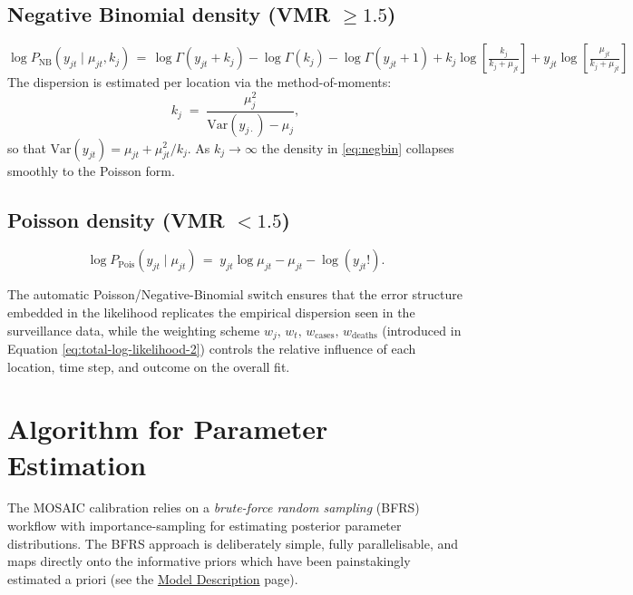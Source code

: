 \documentclass[
]{book}
\begin{document}
\subsection{\texorpdfstring{Negative Binomial density (VMR \(\ge 1.5\))}{Negative Binomial density (VMR \textbackslash ge 1.5)}}\label{negative-binomial-density-vmr-ge-1.5}

\begin{equation}
\log P_{\text{NB}}\!\left(y_{jt}\mid\mu_{jt},k_j\right)
\,=\,
\log\Gamma(y_{jt}+k_j)-\log\Gamma(k_j)-\log\Gamma(y_{jt}+1)
+k_j\log\!\left[\tfrac{k_j}{k_j+\mu_{jt}}\right]
+y_{jt}\log\!\left[\tfrac{\mu_{jt}}{k_j+\mu_{jt}}\right]
\label{eq:negbin}
\end{equation}
The dispersion is estimated per location via the method-of-moments:
\begin{equation}
k_j \;=\;\frac{\mu_j^2}{\mathrm{Var}(y_{j\cdot})-\mu_j},
\label{eq:dispersion}
\end{equation}
so that \(\mathrm{Var}(y_{jt})=\mu_{jt}+\mu_{jt}^2/k_j\). As \(k_j\rightarrow\infty\) the density in
\eqref{eq:negbin} collapses smoothly to the Poisson form.

\subsection{\texorpdfstring{Poisson density (VMR \(< 1.5\))}{Poisson density (VMR \textless{} 1.5)}}\label{poisson-density-vmr-1.5}

\begin{equation}
\log P_{\text{Pois}}\!\left(y_{jt}\mid\mu_{jt}\right)
\,=\;
y_{jt}\log\mu_{jt}-\mu_{jt}-\log(y_{jt}!).
\label{eq:poisson}
\end{equation}

The automatic Poisson/Negative-Binomial switch ensures that the
error structure embedded in the likelihood replicates the empirical
dispersion seen in the surveillance data, while the weighting scheme
\(w_j,\,w_t,\,w_{\text{cases}},\,w_{\text{deaths}}\) (introduced in
Equation \eqref{eq:total-log-likelihood-2}) controls the relative influence
of each location, time step, and outcome on the overall fit.

\section{Algorithm for Parameter Estimation}\label{algorithm-for-parameter-estimation}

The MOSAIC calibration relies on a \emph{brute-force random sampling} (BFRS) workflow with importance-sampling for estimating posterior parameter distributions. The BFRS approach is deliberately simple, fully parallelisable, and maps directly onto the informative priors which have been painstakingly estimated a priori (see the \href{https://www.mosaicmod.org/model-description.html}{Model Description} page).
\end{document}
